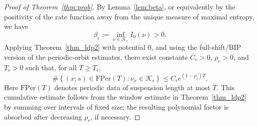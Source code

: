 \documentclass[letterpaper,11pt]{amsart}
\numberwithin{equation}{section}     %
\def\le{\leqslant}
\def\ge{\geqslant}
\begin{document}
\begin{proof}[Proof of Theorem~\ref{thm:prob}]
By Lemma~\ref{lem:beta}, or equivalently by the positivity of the rate
function away from the unique measure of maximal entropy, we have
\[
\beta_\epsilon:=\inf_{\nu\in\mathcal K_\epsilon} I_0(\nu)>0.
\]
Applying Theorem~\ref{thm_ldp2} with potential \(0\), and using the
full-shift/BIP version of the periodic-orbit estimates, there exist constants
\(C_\epsilon>0\), \(\rho_\epsilon>0\), and \(T_\epsilon>0\) such that, for all
\(T\ge T_\epsilon\),
\begin{equation}\label{eq:ldp-cumulative-prob}
\#\left\{
(x;s)\in\mathrm{FPer}(T):
\nu_x\in\mathcal K_\epsilon
\right\}
\le
C_\epsilon e^{(1-\rho_\epsilon)T}.
\end{equation}
Here \(\mathrm{FPer}(T)\) denotes periodic data of suspension length at most
\(T\). This cumulative estimate follows from the window estimate in
Theorem~\ref{thm_ldp2} by summing over intervals of fixed size; the resulting
polynomial factor is absorbed after decreasing \(\rho_\epsilon\), if
necessary.


\end{proof}
\end{document}
